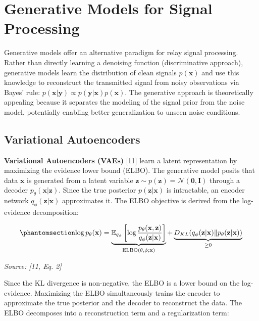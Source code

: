 \section{Generative Models for Signal Processing}\label{sec:generative-models-for-signal-processing}

Generative models offer an alternative paradigm for relay signal processing. Rather than directly learning a denoising function (discriminative approach), generative models learn the distribution of clean signals \(p(\mathbf{x})\) and use this knowledge to reconstruct the transmitted signal from noisy observations via Bayes' rule: \(p(\mathbf{x} | \mathbf{y}) \propto p(\mathbf{y} | \mathbf{x}) p(\mathbf{x})\). The generative approach is theoretically appealing because it separates the modeling of the signal prior from the noise model, potentially enabling better generalization to unseen noise conditions.

\subsection{Variational Autoencoders}\label{sec:variational-autoencoders}

\textbf{Variational Autoencoders (VAEs)} {[}11{]} learn a latent representation by maximizing the evidence lower bound (ELBO). The generative model posits that data \(\mathbf{x}\) is generated from a latent variable \(\mathbf{z} \sim p(\mathbf{z}) = \mathcal{N}(\mathbf{0}, \mathbf{I})\) through a decoder \(p_\theta(\mathbf{x} | \mathbf{z})\). Since the true posterior \(p(\mathbf{z} | \mathbf{x})\) is intractable, an encoder network \(q_\phi(\mathbf{z} | \mathbf{x})\) approximates it. The ELBO objective is derived from the log-evidence decomposition:

\begin{equation}\protect\phantomsection\label{eq:vae-elbo}{\log p_\theta(\mathbf{x}) = \underbrace{\mathbb{E}_{q_\phi}\left[\log \frac{p_\theta(\mathbf{x}, \mathbf{z})}{q_\phi(\mathbf{z} | \mathbf{x})}\right]}_{\text{ELBO}(\theta, \phi; \mathbf{x})} + \underbrace{D_{KL}(q_\phi(\mathbf{z} | \mathbf{x}) \| p_\theta(\mathbf{z} | \mathbf{x}))}_{\geq 0}
}\end{equation} \par{\small\textit{Source: [11, Eq. 2]}}

Since the KL divergence is non-negative, the ELBO is a lower bound on the log-evidence. Maximizing the ELBO simultaneously trains the encoder to approximate the true posterior and the decoder to reconstruct the data. The ELBO decomposes into a reconstruction term and a regularization term:

